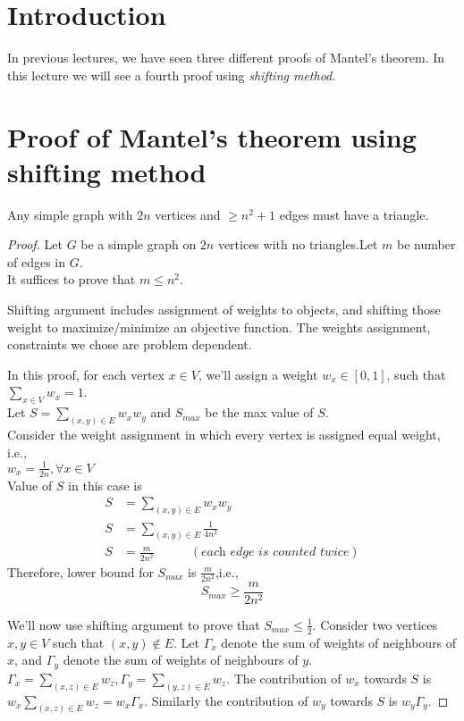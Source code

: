 \section{Introduction}
In previous lectures, we have seen three different proofs of Mantel's theorem. In this lecture we will see a fourth proof using \textit{shifting method}.\\

\section{Proof of Mantel's theorem using shifting method}
\begin{theorem}
Any simple graph with $2n$ vertices and $\ge n^2+1$ edges must have a triangle.
\end{theorem}
\begin{proof}
Let $G$ be a simple graph on $2n$ vertices with no triangles.Let $m$ be number of edges in $G$.\\
It suffices to prove that $m\le n^2$.

Shifting argument includes assignment of weights to objects, and shifting those weight to maximize/minimize an objective function. The weights assignment, constraints we chose are problem dependent.

In this proof, for each vertex $x \in V$, we'll assign a weight 
$w_x \in [0,1]$, such that $\sum_{x\in V}w_x=1$.\\
Let $S=\sum_{(x,y)\in E}w_xw_y$ and $S_{max}$ be the max value of $S$.\\
Consider the weight assignment in which every vertex is assigned equal weight, i.e.,\\ $w_x=\frac{1}{2n}, \forall x\in V$\\
Value of $S$ in this case is 
\begin{align*}
    S&=\sum_{(x,y)\in E}w_xw_y\\
    S&=\sum_{(x,y)\in E}\frac{1}{4n^2}\\
    S&=\frac{m}{2n^2} ~~~~~~~~~~~~~ (\textit{each edge is counted twice})
\end{align*}
Therefore, lower bound for $S_{max}$ is $\frac{m}{2n^2}$,i.e.,
\begin{equation}
    S_{max}\ge \frac{m}{2n^2}
\end{equation}

We'll now use shifting argument to prove that $S_{max}\le \frac{1}{2}$.
Consider two vertices $x,y\in V$ such that $(x,y)\notin E$.
Let $\Gamma_x$ denote the sum of weights of neighbours of $x$, and $\Gamma_y$ denote the sum of weights of neighbours of $y$. $\Gamma_x=\sum_{(x,z)\in E}w_z, \Gamma_y=\sum_{(y,z)\in E}w_z$.
The contribution of $w_x$ towards $S$ is $w_x\sum_{(x,z)\in E}w_z = w_x\Gamma_x$. Similarly the contribution of $w_y$ towards $S$ is $w_y\Gamma_y$.


\end{proof}
